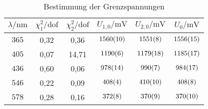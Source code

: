 \begin{table}[htbp]
   \centering
\caption{Bestimmung der Grenzspannungen}
\begin{tabular}{c c c c c c}
\hline$\lambda / \unit{\nano\meter}$ & $\chi_1^2/\mathrm{dof}$ & $\chi_2^2/\mathrm{dof}$ & $U_{1,0}/\unit{\milli\volt}$ & $U_{2,0}/\unit{\milli\volt}$ & $U_0/\unit{\milli\volt}$ \\ 
\hline
$\num{365}$ & 0,32 & 0,36 & $\num{1560\pm 10}$ & $\num{1551\pm 8}$ & $\num{1556\pm 15}$ \\
$\num{405}$ & 0,07 & 14,71 & $\num{1190\pm 6}$ & $\num{1179\pm 18}$ & $\num{1185\pm 17}$ \\
$\num{436}$ & 0,60 & 0,06 & $\num{978\pm 14}$ & $\num{990\pm 7}$ & $\num{984\pm 17}$ \\
$\num{546}$ & 0,22 & 0,09 & $\num{408\pm 4}$ & $\num{410\pm 10}$ & $\num{408\pm 8}$ \\
$\num{578}$ & 0,28 & 0,16 & $\num{372\pm 8}$ & $\num{370\pm 9}$ & $\num{370\pm 10}$ \\
\hline\end{tabular}
\label{fig:messwerte_grenzspannungen}
\end{table}